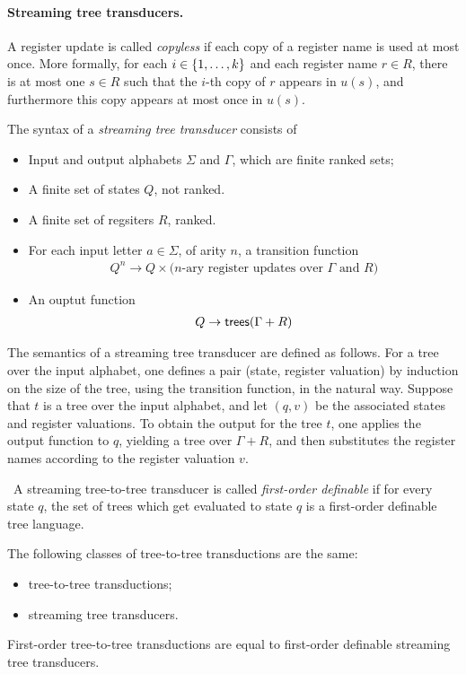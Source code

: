 \paragraph*{Streaming tree transducers.} A register update is called \emph{copyless} if each copy of a register name is used at most once. More formally, for each $i \in \{1,\ldots,k\}$ and each register name $r \in R$, there is at most one $s \in R$ such that the $i$-th copy of $r$ appears in $u(s)$, and furthermore this copy appears at most once in $u(s)$. 


\begin{definition}\label{def:stt}
    The syntax of a  \emph{streaming tree transducer} consists of 
\begin{itemize}
    \item Input and output alphabets $\Sigma$ and $\Gamma$, which are finite ranked sets;
    \item A finite set of states $Q$, not ranked.
    \item A finite set of regsiters $R$, ranked.
    \item For each input letter $a \in \Sigma$, of arity $n$, a transition function
 \begin{align*}
     Q^n \to Q \times \text{($n$-ary register updates over $\Gamma$ and $R$)}
 \end{align*}
 \item An ouptut function
 \begin{align*}
     Q \to \mathsf {trees}(\Gamma + R)
 \end{align*}
\end{itemize}
\end{definition}

The semantics of a streaming tree transducer are defined as follows. For a tree over the input alphabet, one defines a pair (state, register valuation)
by induction on the size of the tree, using the transition function, in the natural way. Suppose that $t$  is a tree over the input alphabet, and let $(q,v)$ be the associated states and register  valuations. To obtain the output for the tree $t$, one applies the output function to $q$, yielding a tree over $\Gamma + R$, and then substitutes the register names according to the register valuation $v$. 


\begin{definition}\ 
    A streaming tree-to-tree transducer is called \emph{first-order definable} if for every state $q$, the set of trees which get evaluated to state $q$ is a first-order definable tree language.
\end{definition}    
\begin{proposition}\label{prop:stt}
    The following classes of tree-to-tree transductions are the same:
    \begin{itemize}
        \item  \mso tree-to-tree transductions;
        \item streaming tree transducers.
    \end{itemize}
    First-order  tree-to-tree transductions are equal to first-order definable streaming tree transducers.
\end{proposition}


